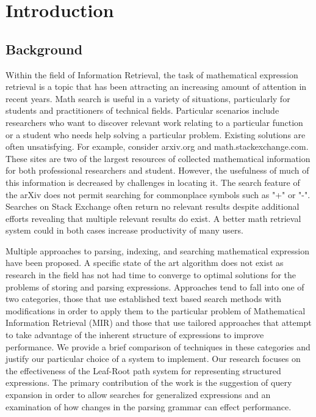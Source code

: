 \documentclass{sig-alternate}
\begin{document}



\section{Introduction}
\subsection{Background}
Within the field of Information Retrieval, the task of mathematical
expression retrieval is a topic that has been attracting an increasing
amount of attention in recent years. Math search is useful in a variety
of situations, particularly for students and practitioners of technical
fields. Particular scenarios include researchers who want to discover
relevant work relating to a particular function or a student who needs
help solving a particular problem. Existing solutions are often
unsatisfying. For example, consider arxiv.org and math.stackexchange.com.
These sites are two of the largest resources of collected mathematical
information for both professional researchers and student. However, the
usefulness of much of this information is decreased by challenges in
locating it. The search feature of the arXiv does not permit searching for
commonplace symbols such as "+" or "-". Searches on Stack Exchange often
return no relevant results despite additional efforts revealing that multiple
relevant results do exist. A better math retrieval system could in both cases
increase productivity of many users.

Multiple approaches to parsing, indexing, and searching mathematical
expression have been proposed. A specific state of the art algorithm
does not exist as research in the field has not had time to converge
to optimal solutions for the problems of storing and parsing expressions.
Approaches tend to fall into one of two categories, those that use
established text based search methods with modifications in order
to apply them to the particular problem of Mathematical Information
Retrieval (MIR) and those that use tailored approaches that attempt
to take advantage of the inherent structure of expressions to improve
performance. We provide a brief comparison of techniques in these 
categories and justify our particular choice of a system to implement. 
Our research focuses on the effectiveness of the Leaf-Root path system
for representing structured expressions. The primary contribution of the
work is the suggestion of query expansion in order to allow searches for
generalized expressions and an examination of how changes in the 
parsing grammar can effect performance.
\end{document}
